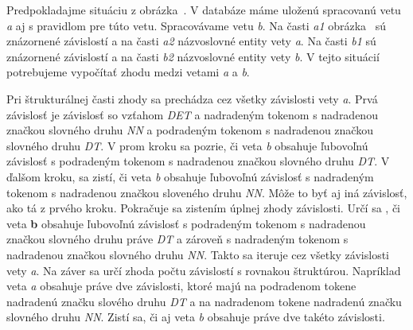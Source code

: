 Predpokladajme situáciu z obrázka~. V databáze máme uloženú spracovanú vetu \textit{a} aj s pravidlom pre túto vetu. Spracovávame vetu \textit{b}. Na časti \textit{a1} obrázka~ sú znázornené závislostí a na časti \textit{a2} názvoslovné entity vety \textit{a}. Na časti \textit{b1} sú znázornené závislostí a na časti \textit{b2} názvoslovné entity vety \textit{b}. V tejto situácií potrebujeme vypočítať zhodu medzi vetami \textit{a} a \textit{b}. 

Pri štrukturálnej časti zhody sa prechádza cez všetky závislosti vety \textit{a}. Prvá závislosť je závislosť so vzťahom \textit{DET} a nadradeným tokenom s nadradenou značkou slovného druhu \textit{NN} a podradeným tokenom s nadradenou značkou slovného druhu \textit{DT}. V prom kroku sa pozrie, či veta \textit{b} obsahuje ľubovoľnú závislosť s podradeným tokenom s nadradenou značkou slovného druhu \textit{DT}. V ďalšom kroku, sa zistí, či veta \textit{b} obsahuje ľubovoľnú závislosť s nadradeným tokenom s nadradenou značkou sloveného druhu \textit{NN}. Môže to byť aj iná závislosť, ako tá z prvého kroku. Pokračuje sa zistením úplnej zhody závislosti. Určí sa , či veta \textbf{b} obsahuje ľubovoľnú závislosť s podradeným tokenom s nadradenou značkou slovného druhu práve \textit{DT} a zároveň s nadradeným tokenom s nadradenou značkou slovného druhu \textit{NN}. Takto sa iteruje cez všetky závislosti vety \textit{a}. Na záver sa určí zhoda počtu závislostí s rovnakou štruktúrou. Napríklad veta \textit{a} obsahuje práve dve závislosti, ktoré majú na podradenom tokene nadradenú značku slového druhu \textit{DT} a na nadradenom tokene nadradenú značku slovného druhu \textit{NN}. Zistí sa, či aj veta \textit{b} obsahuje práve dve takéto závislosti. \\

